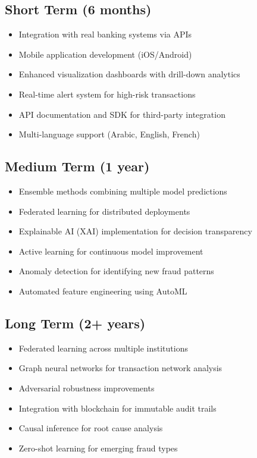 \documentclass[12pt,a4paper,twoside]{report}
\begin{document}
\subsection*{Short Term (6 months)}

\begin{itemize}
    \item Integration with real banking systems via APIs
    \item Mobile application development (iOS/Android)
    \item Enhanced visualization dashboards with drill-down analytics
    \item Real-time alert system for high-risk transactions
    \item API documentation and SDK for third-party integration
    \item Multi-language support (Arabic, English, French)
\end{itemize}

\subsection*{Medium Term (1 year)}

\begin{itemize}
    \item Ensemble methods combining multiple model predictions
    \item Federated learning for distributed deployments
    \item Explainable AI (XAI) implementation for decision transparency
    \item Active learning for continuous model improvement
    \item Anomaly detection for identifying new fraud patterns
    \item Automated feature engineering using AutoML
\end{itemize}

\subsection*{Long Term (2+ years)}

\begin{itemize}
    \item Federated learning across multiple institutions
    \item Graph neural networks for transaction network analysis
    \item Adversarial robustness improvements
    \item Integration with blockchain for immutable audit trails
    \item Causal inference for root cause analysis
    \item Zero-shot learning for emerging fraud types
\end{itemize}
\end{document}
